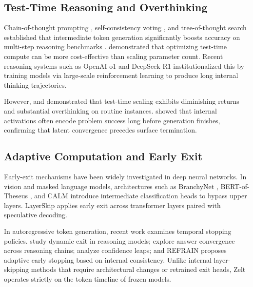 \documentclass[11pt]{article}
\begin{document}
\subsection{Test-Time Reasoning and Overthinking}
Chain-of-thought prompting \citep{wei2022cot}, self-consistency voting \citep{wang2022selfconsistency}, and tree-of-thought search \citep{yao2023tot} established that intermediate token generation significantly boosts accuracy on multi-step reasoning benchmarks \citep{cobbe2021gsm8k}. \citet{snell2024scaling} demonstrated that optimizing test-time compute can be more cost-effective than scaling parameter count. Recent reasoning systems such as OpenAI o1 \citep{openai2024o1} and DeepSeek-R1 \citep{deepseek2025r1} institutionalized this by training models via large-scale reinforcement learning to produce long internal thinking trajectories.

However, \citet{chen2024think} and \citet{fan2025overthinking} demonstrated that test-time scaling exhibits diminishing returns and substantial overthinking on routine instances. \citet{afzal2025knowing} showed that internal activations often encode problem success long before generation finishes, confirming that latent convergence precedes surface termination.

\subsection{Adaptive Computation and Early Exit}
Early-exit mechanisms have been widely investigated in deep neural networks. In vision and masked language models, architectures such as BranchyNet \citep{teerapittayanon2016branchynet}, BERT-of-Theseus \citep{zhou2020bert}, and CALM \citep{schuster2022confident} introduce intermediate classification heads to bypass upper layers. LayerSkip \citep{elhoushi2024layerskip} applies early exit across transformer layers paired with speculative decoding.

In autoregressive token generation, recent work examines temporal stopping policies. \citet{yang2025dynamic} study dynamic exit in reasoning models; \citet{liu2025convergence} explore answer convergence across reasoning chains; \citet{tikhonov2026confidence} analyze confidence leaps; and REFRAIN \citep{sun2025refrain} proposes adaptive early stopping based on internal consistency. Unlike internal layer-skipping methods that require architectural changes or retrained exit heads, Zelt operates strictly on the token timeline of frozen models.
\end{document}
